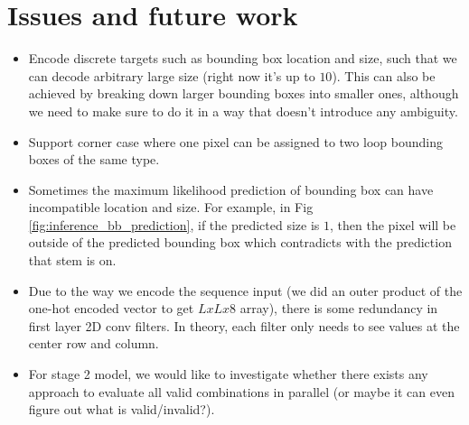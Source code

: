 \documentclass[12pt]{article}
\begin{document}
\section{Issues and future work}

\begin{itemize}
    \item Encode discrete targets such as bounding box location and size, such that we can decode arbitrary large size (right now it's up to $10$).
    This can also be achieved by breaking down larger bounding boxes into smaller ones, although we need to make sure to do it in a way
    that doesn't introduce any ambiguity.
    \item Support corner case where one pixel can be assigned to two loop bounding boxes of the same type.
    \item Sometimes the maximum likelihood prediction of bounding box can have incompatible location and size.
    For example, in Fig \ref{fig:inference_bb_prediction}, if the predicted size is $1$, then the pixel will be
    outside of the predicted bounding box which contradicts with the prediction that stem is on.
    \item Due to the way we encode the sequence input (we did an outer product of the one-hot encoded vector to get $L x L x 8$ array),
    there is some redundancy in first layer 2D conv filters. In theory, each filter only needs to see values at the
    center row and column.
    \item For stage 2 model, we would like to investigate whether there exists any approach to evaluate all valid
    combinations in parallel (or maybe it can even figure out what is valid/invalid?).
\end{itemize}




%
%
\end{document}
